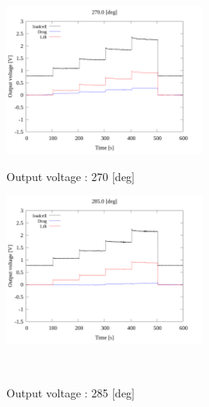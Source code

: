     \begin{figure}[htbp]
      \begin{minipage}[b]{0.45\linewidth}
        \centering
        \includegraphics[width=65mm]{../../02_workspace/result/2-1/plot/01-3_allsensors/01_allsensors_2700.png}
        \caption{Output voltage : 270 [deg]}
      \end{minipage}
      \begin{minipage}[b]{0.45\linewidth}
        \centering
        \includegraphics[width=65mm]{../../02_workspace/result/2-1/plot/01-3_allsensors/01_allsensors_2850.png}
        \caption{Output voltage : 285 [deg]}
      \end{minipage}\\


\end{figure}
